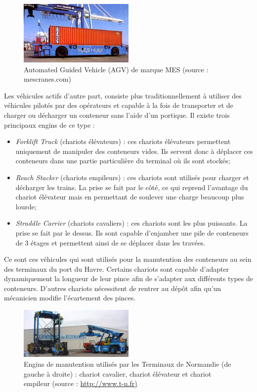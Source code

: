 \begin{figure}[ht]
 \label{fig:AGV}
 \begin{center}
 \includegraphics[width=0.5\textwidth]{chapitres/application/agv.png}
 \caption{Automated Guided Vehicle (AGV) de marque MES (source : mescranes.com)}
 \end{center}
\end{figure}

Les véhicules actifs d'autre part, consiste plus traditionnellement à utiliser des véhicules pilotés par des opérateurs et capable à la fois de transporter et de charger ou décharger un conteneur sans l'aide d'un portique. Il existe trois principaux engins de ce type : 
\begin{itemize}
 \item \textit{Forklift Truck} (chariots élévateurs) : ces chariots élévateurs permettent uniquement de manipuler des conteneurs vides. Ils servent donc à déplacer ces conteneurs dans une partie particulière du terminal où ils sont stockés;
 \item \textit{Reach Stacker }(chariots empileurs) : ces chariots sont utilisés pour charger et décharger les trains. La prise se fait par le côté, ce qui reprend l'avantage du chariot élévateur mais en permettant de soulever une charge beaucoup plus lourde;
 \item \textit{Straddle Carrier} (chariots cavaliers) : ces chariots sont les plus puissants. La prise se fait par le dessus. Ils sont capable d'enjamber une pile de conteneurs de 3 étages et permettent ainsi de se déplacer dans les travées.
\end{itemize}

Ce sont ces véhicules qui sont utilisés pour la manutention des conteneurs au sein des terminaux du port du Havre. Certains chariots sont capable d'adapter dynamiquement la longueur de leur pince afin de s'adapter aux différents types de conteneurs. D'autres chariots nécessitent de rentrer au dépôt afin qu'un mécanicien modifie l'écartement des pinces.
\begin{figure}[ht]
 \label{fig:enginsManutention}
 \begin{center}
 \includegraphics[width=0.5\textwidth]{chapitres/application/enginsTN.png}
 \caption{Engins de manutention utilisés par les Terminaux de Normandie (de gauche à droite) : chariot cavalier, chariot élévateur et chariot empileur (source : \url{http://www.t-n.fr)}}
 \end{center}
\end{figure}

